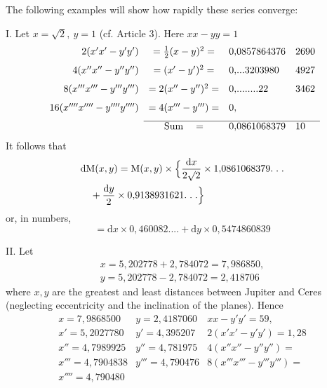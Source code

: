 \begingroup
\renewcommand{\arraystretch}{1.45}
The following examples will show how rapidly these series converge:

\par I. Let \(x=\surd 2,\ y=1\) (cf. Article 3). Here \(xx-yy=1\)
\begingroup\small\setlength{\arraycolsep}{3pt}
\[
\begin{array}{rcll}
2(x'x'-y'y')&=\tfrac12(x-y)^2=&0{,}0857864376&2690\\[7pt]
4(x''x''-y''y'')&=(x'-y')^2=&0{,}\mathord{.}\mathord{.}\mathord{.}3203980&4927\\[7pt]
8(x'''x'''-y'''y''')&=2(x''-y'')^2=&0{,}\mathord{.}\mathord{.}\mathord{.}\mathord{.}\mathord{.}\mathord{.}\mathord{.}\mathord{.}22&3462\\[7pt]
16(x''''x''''-y''''y'''')&=4(x'''-y''')=&0{,}&\\[7pt]
\cline{2-4}
&\mathrm{Sum}\quad=&0{,}0861068379&10
\end{array}
\]
\endgroup
It follows that
\[
\begin{aligned}&\mathrm{d}\mathrm{M}(x,y)=\mathrm{M}(x,y)\times
\Bigl\{\frac{\mathrm{d}x}{2\surd 2}\times1{,}0861068379.\;.\;.\\&\quad+\frac{\mathrm{d}y}{2}\times0{,}9138931621.\;.\;.\Bigr\}\end{aligned}
\]
or, in numbers,
\[
=\mathrm{d}x\times0{,}460082\mathord{.}\mathord{.}\mathord{.}\mathord{.}
+\mathrm{d}y\times0{,}5474860839
\]
\par II. Let
\[
\begin{gathered}x=5{,}202778+2{,}784072=7{,}986850,\\[7pt]
y=5{,}202778-2{,}784072=2{,}418706\end{gathered}
\]
where \(x,y\) are the greatest and least distances between Jupiter and Ceres (neglecting eccentricity and the inclination of the planes). Hence
\begingroup\small\setlength{\arraycolsep}{3pt}
\[
\begin{array}{lll}
x=7{,}9868500&y=2{,}4187060&xx-y'y'=59{,}\\[7pt]
x'=5{,}2027780&y'=4{,}395207&2(x'x'-y'y')=1{,}28\\[7pt]
x''=4{,}7989925&y''=4{,}781975&4(x''x''-y''y'')=\\[7pt]
x'''=4{,}7904838&y'''=4{,}790476&8(x'''x'''-y'''y''')=\\[7pt]
x''''=4{,}790480&&
\end{array}
\]
\endgroup

\clearpage
\endgroup
